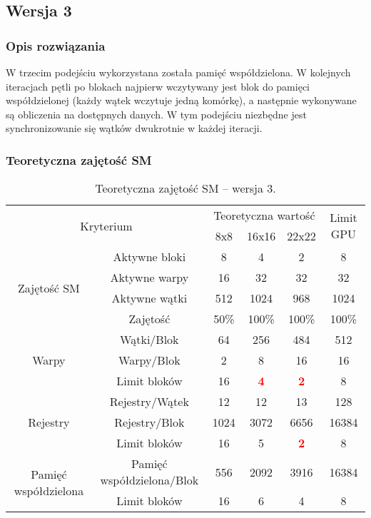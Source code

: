 
\subsection{Wersja 3}

\subsubsection{Opis rozwiązania}

W trzecim podejściu wykorzystana została pamięć współdzielona. W kolejnych iteracjach pętli po blokach najpierw wczytywany jest blok do pamięci współdzielonej (każdy wątek wczytuje jedną komórkę), a następnie wykonywane są obliczenia na dostępnych danych. W tym podejściu niezbędne jest synchronizowanie się wątków dwukrotnie w każdej iteracji.



\subsubsection{Teoretyczna zajętość SM}

\begin{center}
\begin{table}[H]
\centering
\begin{tabular}{|c|c|c|c|c|c|}
\hline
\multicolumn{2}{|c|}{\multirow{2}{*}{Kryterium}} & \multicolumn{3}{c|}{Teoretyczna wartość} & \multirow{2}{*}{Limit GPU} \\ \cline{3-5}
\multicolumn{2}{|c|}{} & 8x8 & 16x16 & 22x22 & \\ \hline
\multirow{4}{*}{Zajętość SM} & Aktywne bloki & 8 & 4 & 2 & 8 \\ \cline{2-6}
& Aktywne warpy & 16 & 32 & 32 & 32 \\ \cline{2-6}
& Aktywne wątki & 512 & 1024 & 968 & 1024 \\ \cline{2-6}
& Zajętość & 50\% & 100\% & 100\% & 100\% \\ \hline
\multirow{3}{*}{Warpy} & Wątki/Blok & 64 & 256 & 484 & 512 \\ \cline{2-6}
& Warpy/Blok & 2 & 8 & 16 & 16 \\ \cline{2-6}
& Limit bloków & 16 & \textcolor{red}{\textbf{4}} & \textcolor{red}{\textbf{2}} & 8 \\ \hline
\multirow{3}{*}{Rejestry} & Rejestry/Wątek & 12 & 12 & 13 & 128 \\ \cline{2-6}
& Rejestry/Blok & 1024 & 3072 & 6656 & 16384 \\ \cline{2-6}
& Limit bloków & 16 & 5 & \textcolor{red}{\textbf{2}} & 8 \\ \hline
\multirow{2}{*}{Pamięć współdzielona} & Pamięć współdzielona/Blok & 556 & 2092 & 3916 & 16384 \\ \cline{2-6}
& Limit bloków & 16 & 6 & 4 & 8 \\ \hline
\end{tabular}
\caption{Teoretyczna zajętość SM -- wersja 3.}
\end{table}
\end{center}

